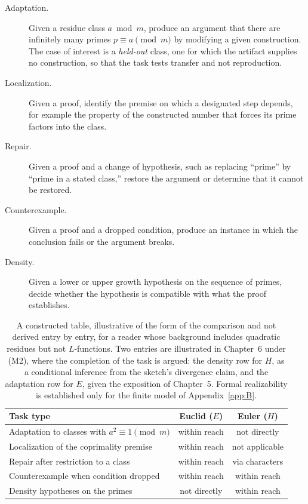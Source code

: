 \documentclass[11pt]{book}
\theoremstyle{definition}
\theoremstyle{remark}
\begin{document}
\begin{description}
\item[Adaptation.] Given a residue class $a \bmod m$, produce an argument that there are infinitely many primes $p\equiv a\pmod m$ by modifying a given construction. The case of interest is a \emph{held-out} class, one for which the artifact supplies no construction, so that the task tests transfer and not reproduction.
\item[Localization.] Given a proof, identify the premise on which a designated step depends, for example the property of the constructed number that forces its prime factors into the class.
\item[Repair.] Given a proof and a change of hypothesis, such as replacing ``prime'' by ``prime in a stated class,'' restore the argument or determine that it cannot be restored.
\item[Counterexample.] Given a proof and a dropped condition, produce an instance in which the conclusion fails or the argument breaks.
\item[Density.] Given a lower or upper growth hypothesis on the sequence of primes, decide whether the hypothesis is compatible with what the proof establishes.
\end{description}

\begin{table}[ht]
\centering
\begin{tabular}{lcc}
\toprule
Task type & Euclid ($E$) & Euler ($H$) \\
\midrule
Adaptation to classes with $a^2\equiv1\pmod m$ & within reach & not directly \\
Localization of the coprimality premise & within reach & not applicable \\
Repair after restriction to a class & within reach & via characters \\
Counterexample when condition dropped & within reach & within reach \\
Density hypotheses on the primes & not directly & within reach \\
\bottomrule
\end{tabular}
\caption{A constructed table, illustrative of the form of the comparison and not derived entry by entry, for a reader whose background includes quadratic residues but not $L$-functions. Two entries are illustrated in Chapter~6 under (M2), where the completion of the task is argued: the density row for $H$, as a conditional inference from the sketch's divergence claim, and the adaptation row for $E$, given the exposition of Chapter~5. Formal realizability is established only for the finite model of Appendix~\ref{app:B}.}
\end{table}
\end{document}

